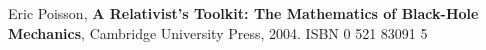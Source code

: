 \documentclass[10pt,a4paper,oneside]{article}
\theoremstyle{plain}
\theoremstyle{definition}
\theoremstyle{remark}
\numberwithin{equation}{section}
\begin{document}
%

%


%



%

%


%

%




%



\begin{thebibliography}{9}
Eric Poisson, 
\textbf{A Relativist's Toolkit: The Mathematics of Black-Hole Mechanics},
Cambridge University Press, 
2004.
ISBN 0 521 83091 5

\end{thebibliography}
\end{document}
